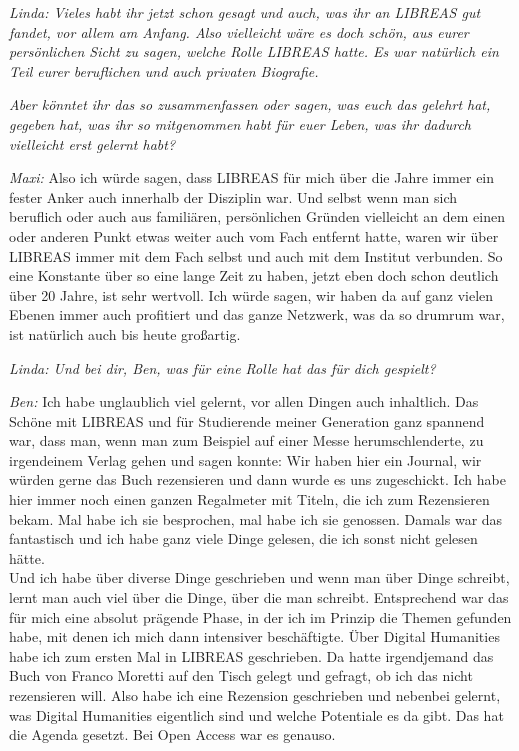 \documentclass[a4paper,
fontsize=11pt,
oneside,
numbers=noperiodatend,
parskip=half-,
bibliography=totoc,
final
]{scrartcl}
\begin{document}
\emph{Linda: Vieles habt ihr jetzt schon gesagt und auch, was ihr an
LIBREAS gut fandet, vor allem am Anfang. Also vielleicht wäre es doch
schön, aus eurer persönlichen Sicht zu sagen, welche Rolle LIBREAS
hatte. Es war natürlich ein Teil eurer beruflichen und auch privaten
Biografie.}

\emph{Aber könntet ihr das so zusammenfassen oder sagen, was euch das
gelehrt hat, gegeben hat, was ihr so mitgenommen habt für euer Leben,
was ihr dadurch vielleicht erst gelernt habt?}

\emph{Maxi:} Also ich würde sagen, dass LIBREAS für mich über die Jahre
immer ein fester Anker auch innerhalb der Disziplin war. Und selbst wenn
man sich beruflich oder auch aus familiären, persönlichen Gründen
vielleicht an dem einen oder anderen Punkt etwas weiter auch vom Fach
entfernt hatte, waren wir über LIBREAS immer mit dem Fach selbst und
auch mit dem Institut verbunden. So eine Konstante über so eine lange
Zeit zu haben, jetzt eben doch schon deutlich über 20 Jahre, ist sehr
wertvoll. Ich würde sagen, wir haben da auf ganz vielen Ebenen immer
auch profitiert und das ganze Netzwerk, was da so drumrum war, ist
natürlich auch bis heute großartig.

\emph{Linda: Und bei dir, Ben, was für eine Rolle hat das für dich
gespielt?}

\emph{Ben:} Ich habe unglaublich viel gelernt, vor allen Dingen auch
inhaltlich. Das Schöne mit LIBREAS und für Studierende meiner Generation
ganz spannend war, dass man, wenn man zum Beispiel auf einer Messe
herumschlenderte, zu irgendeinem Verlag gehen und sagen konnte: Wir
haben hier ein Journal, wir würden gerne das Buch rezensieren und dann
wurde es uns zugeschickt. Ich habe hier immer noch einen ganzen
Regalmeter mit Titeln, die ich zum Rezensieren bekam. Mal habe ich sie
besprochen, mal habe ich sie genossen. Damals war das fantastisch und
ich habe ganz viele Dinge gelesen, die ich sonst nicht gelesen hätte.\\
Und ich habe über diverse Dinge geschrieben und wenn man über Dinge
schreibt, lernt man auch viel über die Dinge, über die man schreibt.
Entsprechend war das für mich eine absolut prägende Phase, in der ich im
Prinzip die Themen gefunden habe, mit denen ich mich dann intensiver
beschäftigte. Über Digital Humanities habe ich zum ersten Mal in LIBREAS
geschrieben. Da hatte irgendjemand das Buch von Franco Moretti auf den
Tisch gelegt und gefragt, ob ich das nicht rezensieren will. Also habe
ich eine Rezension geschrieben und nebenbei gelernt, was Digital
Humanities eigentlich sind und welche Potentiale es da gibt. Das hat die
Agenda gesetzt. Bei Open Access war es genauso.
\end{document}
